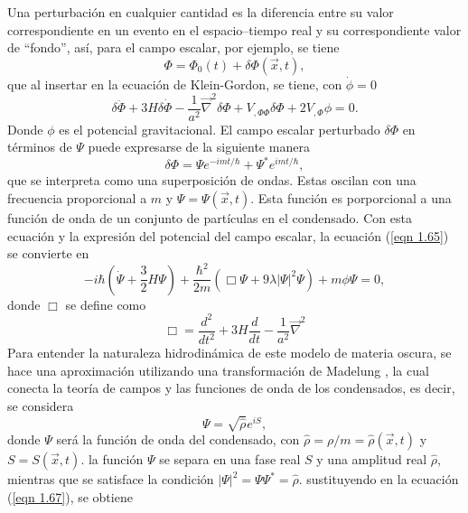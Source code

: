 \documentclass[a4paper,openright,12pt]{book}
\begin{document}
Una perturbación en cualquier cantidad es la diferencia entre su valor correspondiente en un evento en el espacio--tiempo real y su correspondiente valor de ``fondo'', así, para el campo escalar, por ejemplo, se tiene
\begin{equation}
\Phi = \Phi_{0}(t) + \delta\Phi(\vec{x},t),\label{eqn 1.64}
\end{equation}
que al insertar en la ecuación de Klein-Gordon, se tiene, con $\dot{\phi}=0$
\begin{equation}
\delta\ddot{\Phi} + 3H\delta\dot{\Phi}
- \frac{1}{a^{2}}\vec{\nabla}^{2}\delta\Phi
+V_{,\Phi\Phi}\delta\Phi +2V_{,\Phi}\phi = 0.\label{eqn 1.65}
\end{equation}
Donde $\phi$ es el potencial gravitacional. El campo escalar perturbado $\delta\Phi$ en términos de $\Psi$ puede expresarse de la siguiente manera
\begin{equation}
\delta\Phi = \Psi e^{-imt/\hbar} +\Psi^{*}e^{imt/\hbar},\label{eqn 1.66}
\end{equation}
que se interpreta como una superposición de ondas. Estas oscilan con una frecuencia proporcional a $m$ y $\Psi = \Psi(\vec{x},t)$. Esta función es porporcional a una función de onda de un conjunto de partículas en el condensado. Con esta ecuación y la expresión del potencial del campo escalar, la ecuación (\ref{eqn 1.65}) se convierte en 
\begin{equation}
-i\hbar(\dot{\Psi}+\frac{3}{2}H\Psi) + \frac{\hbar^{2}}{2m}(\Box \Psi +9\lambda|\Psi|^{2}\Psi) + m\phi\Psi = 0,\label{eqn 1.67}
\end{equation}
donde $\Box$ se define como 
\begin{equation}
\Box = \frac{d^{2}}{d t^{2}} + 3H\frac{d}{d t} - \frac{1}{a^{2}}\vec{\nabla}^{2}\label{eqn 1.68}
\end{equation}
Para entender la naturaleza hidrodinámica de este modelo de materia oscura, se hace una aproximación utilizando una transformación de Madelung \cite{3.2, 3.3, 3.4}, la cual conecta la teoría de campos y las funciones de onda de los condensados, es decir, se considera 
\begin{equation}
\Psi=\sqrt{\hat{\rho}} e^{iS},\label{eqn 1.69}
\end{equation}
donde $\Psi$ será la función de onda del condensado, con $\hat{\rho}=\rho/m=\hat{\rho}(\vec{x},t)$ y $S=S(\vec{x},t)$. la función $\Psi$ se separa en una fase real $S$ y una amplitud real $\hat{\rho}$, mientras que se satisface la condición $|\Psi|^{2}=\Psi\Psi^{*}= \hat{\rho}$. sustituyendo en la ecuación (\ref{eqn 1.67}), se obtiene
\end{document}
